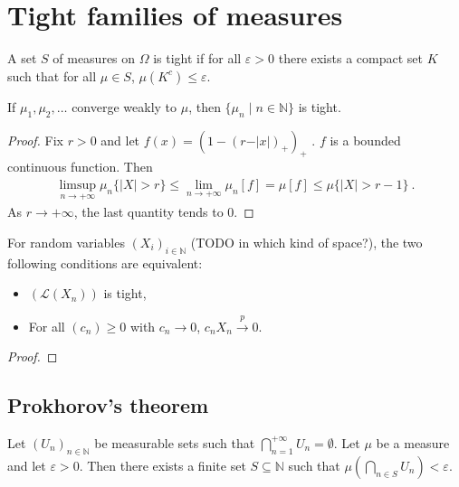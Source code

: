 \chapter{Tight families of measures}

\begin{definition}\label{def:tight}
 \leanok
A set $S$ of measures on $\Omega$ is tight if for all $\varepsilon > 0$ there exists a compact set $K$ such that for all $\mu \in S$, $\mu(K^c) \le \varepsilon$.
\end{definition}

\begin{lemma}\label{lem:tight_of_cvg}
If $\mu_1, \mu_2, \ldots$ converge weakly to $\mu$, then $\{\mu_n \mid n \in \mathbb{N}\}$ is tight.
\end{lemma}

\begin{proof}
Fix $r > 0$ and let $f(x) = (1 - (r - \vert x \vert)_+)_+$ . $f$ is a bounded continuous function. Then
\begin{align*}
\limsup_{n \to +\infty} \mu_n\{\vert X \vert > r\}
\le \lim_{n \to +\infty} \mu_n\left[ f \right]
= \mu[f]
\le \mu\{\vert X \vert > r - 1\} \: .
\end{align*}
As $r \to +\infty$, the last quantity tends to 0.
\end{proof}

\begin{lemma}\label{tight_iff_cvg_probability}
For random variables $(X_i)_{i \in \mathbb{N}}$ (TODO in which kind of space?), the two following conditions are equivalent:
\begin{itemize}
	\item $(\mathcal L(X_n))$ is tight,
	\item For all $(c_n) \ge 0$ with $c_n \to 0$, $c_n X_n \xrightarrow{p} 0$.
\end{itemize}
\end{lemma}

\begin{proof}

\end{proof}


\section{Prokhorov's theorem}

\begin{lemma}\label{lem:exists_finite_union_inter_lt}
Let $(U_n)_{n \in \mathbb{N}}$ be measurable sets such that $\bigcap_{n=1}^{+ \infty} U_n = \emptyset$. Let $\mu$ be a measure and let $\varepsilon > 0$. Then there exists a finite set $S \subseteq \mathbb{N}$ such that $\mu(\bigcap_{n \in S} U_n) < \varepsilon$.
\end{lemma}

